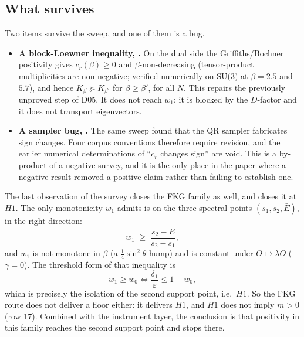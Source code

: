 \subsection{What survives}\label{sec:survey-survives}

Two items survive the sweep, and one of them is a bug.

\begin{itemize}
\item \textbf{A block-Loewner inequality, \LT.} On the dual side the Griffiths/Bochner
  positivity gives $c_r(\beta)\ge0$ and $\beta$-non-decreasing (tensor-product
  multiplicities are non-negative; verified numerically on SU(3) at $\beta=2.5$ and
  $5.7$), and hence $K_\beta\succeq K_{\beta'}$ for $\beta\ge\beta'$, for all $N$. This
  repairs the previously unproved step of D05. It does not reach $w_1$: it is blocked by
  the $D$-factor and it does not transport eigenvectors.
\item \textbf{A sampler bug, \LE.} The same sweep found that the QR sampler fabricates
  sign changes. Four corpus conventions therefore require revision, and the earlier
  numerical determinations of ``$c_r$ changes sign'' are void. This is a by-product of a
  negative survey, and it is the only place in the paper where a negative result removed a
  positive claim rather than failing to establish one.
\end{itemize}

The last observation of the survey closes the FKG family as well, and closes it at $H1$.
The only monotonicity $w_1$ admits is on the three spectral points $(s_1,s_2,\bar E)$, in
the right direction:
\[
w_1\;\ge\;\frac{s_2-\bar E}{s_2-s_1},
\]
and $w_1$ is not monotone in $\beta$ (a $\tfrac14\sin^2\theta$ hump) and is constant under
$O\mapsto\lambda O$ ($\gamma=0$). The threshold form of that inequality is
\[
w_1\ge w_0 \iff \frac{\delta_1}{\varepsilon}\le 1-w_0,
\]
which is precisely the isolation of the second support point, i.e.\ $H1$. So the FKG route
does not deliver a floor either: it delivers $H1$, and $H1$ does not imply $m>0$ (row 17).
Combined with the instrument layer, the conclusion is that positivity in this family reaches
the second support point and stops there.

